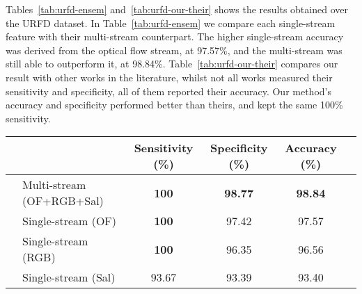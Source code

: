 \documentclass[conference]{IEEEtran}
\begin{document}
Tables~\ref{tab:urfd-ensem} and~\ref{tab:urfd-our-their} shows the results obtained over the URFD dataset. In Table~\ref{tab:urfd-ensem} we compare each single-stream feature with their multi-stream counterpart. The higher single-stream accuracy was derived from the optical flow stream, at 97.57\%, and the multi-stream was still able to outperform it, at 98.84\%. Table~\ref{tab:urfd-our-their} compares our result with other works in the literature, whilst not all works measured their sensitivity and specificity, all of them reported their accuracy. Our method's accuracy and specificity performed better than theirs, and kept the same 100\% sensitivity.

\begin{table*}[t]
\centering
\caption{URFD single-stream \textit{vs} multi-stream, decreasing accuracy.}
\label{tab:urfd-ensem}
\begin{tabular}{llcccl}
\hline
 &                              & Sensitivity (\%)  & Specificity (\%)  & Accuracy (\%)     & \\ \hline
 & Multi-stream (OF+RGB+Sal)    & \textbf{100}      & \textbf{98.77}    & \textbf{98.84}    & \\
 & Single-stream (OF)           & \textbf{100}      & 97.42             & 97.57             & \\
 & Single-stream (RGB)          & \textbf{100}      & 96.35             & 96.56             & \\
 & Single-stream (Sal)          & 93.67             & 93.39             & 93.40             & \\ \hline
\end{tabular}
\end{table*}
\end{document}
